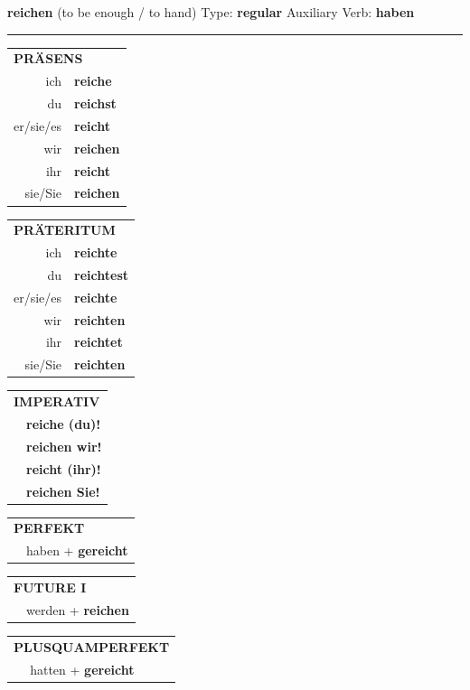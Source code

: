 \documentclass[10pt,a4paper]{revtex4-2}
\begin{document}
\begin{verbbox}
{\Large \bf reichen} (to be enough / to hand) \hfill Type: \textbf{regular} \hfill Auxiliary Verb: \textbf{haben} 

\vspace{5pt}
\hrule
\vspace{5pt}

\begin{tabular}{rl}
\multicolumn{2}{l}{\textbf{PRÄSENS}}\\
ich & \textbf{reiche}\\
du & \textbf{reichst}\\
er/sie/es & \textbf{reicht}\\
wir & \textbf{reichen}\\
ihr & \textbf{reicht}\\
sie/Sie & \textbf{reichen}\\
\end{tabular}
\hfill
\begin{tabular}{rl}
\multicolumn{2}{l}{\textbf{PRÄTERITUM}}\\
ich & \textbf{reichte}\\
du & \textbf{reichtest}\\
er/sie/es & \textbf{reichte}\\
wir & \textbf{reichten}\\
ihr & \textbf{reichtet}\\
sie/Sie & \textbf{reichten}\\
\end{tabular}
\hfill
\begin{tabular}{rl}
\multicolumn{2}{l}{\textbf{IMPERATIV}}\\
& \textbf{reiche (du)!}\\
& \textbf{reichen wir!}\\
& \textbf{reicht (ihr)!}\\
& \textbf{reichen Sie!}\\
\end{tabular}

\vspace{10pt}

\begin{tabular}{rl}
\multicolumn{2}{l}{\textbf{PERFEKT}}\\
& haben + \textbf{gereicht}\\
\end{tabular}
\hfill
\begin{tabular}{rl}
\multicolumn{2}{l}{\textbf{FUTURE I}}\\
& werden + \textbf{reichen}\\
\end{tabular}
\hfill
\begin{tabular}{rl}
\multicolumn{2}{l}{\textbf{PLUSQUAMPERFEKT}}\\
& hatten + \textbf{gereicht}\\
\end{tabular}


\end{verbbox}
\end{document}
